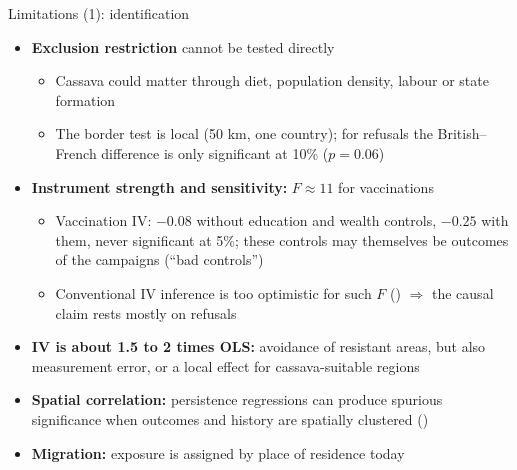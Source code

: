 \documentclass[aspectratio=1610]{beamer}
\newcommand{\refs}[1]{{\footnotesize\color{softgray}(\citealp{#1})}} %
\begin{document}
\begin{frame}{Limitations (1): identification}
  \begin{itemize}
    \item \textbf{Exclusion restriction} cannot be tested directly
      \begin{itemize}
        \item Cassava could matter through diet, population density, labour or state formation
        \item The border test is local (50 km, one country); for refusals the British--French
          difference is only significant at 10\% ($p = 0.06$)
      \end{itemize}
    \item \textbf{Instrument strength and sensitivity:} $F \approx 11$ for vaccinations
      \begin{itemize}
        \item Vaccination IV: $-0.08$ without education and wealth controls, $-0.25$ with them, never
          significant at 5\%; these controls may themselves be outcomes of the campaigns (``bad controls'')
        \item Conventional IV inference is too optimistic for such $F$ \refs{lee_etal_2022}
          $\Rightarrow$ the causal claim rests mostly on refusals
      \end{itemize}
    \item \textbf{IV is about 1.5 to 2 times OLS:} avoidance of resistant areas, but also measurement error,
      or a local effect for cassava-suitable regions
    \item \textbf{Spatial correlation:} persistence regressions can produce spurious significance
      when outcomes and history are spatially clustered \refs{kelly_2019}
    \item \textbf{Migration:} exposure is assigned by place of residence today
  \end{itemize}
\end{frame}
\end{document}
